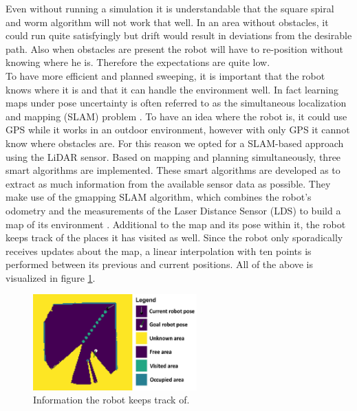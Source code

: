 \documentclass[conference]{IEEEtran}
\begin{document}
Even without running a simulation it is understandable that the square spiral and worm algorithm will not work that well. In an area without obstacles, it could run quite satisfyingly but drift would result in deviations from the desirable path. Also when obstacles are present the robot will have to re-position without knowing where he is. Therefore the expectations are quite low.\\

To have more efficient and planned sweeping, it is important that the robot knows where it is and that it can handle the environment well. In fact learning maps under pose uncertainty is often referred to as the simultaneous localization and mapping (SLAM) problem \cite{Grisetti2010}. To have an idea where the robot is, it could use GPS while it works in an outdoor environment, however with only GPS it cannot know where obstacles are. For this reason we opted for a SLAM-based approach using the LiDAR sensor. Based on mapping and planning simultaneously, three smart algorithms are implemented. These smart algorithms are developed as to extract as much information from the available sensor data as possible. They make use of the gmapping SLAM algorithm, which combines the robot's odometry and the measurements of the Laser Distance Sensor (LDS) to build a map of its environment \cite{gmapping}. Additional to the map and its pose within it, the robot keeps track of the places it has visited as well. Since the robot only sporadically receives updates about the map, a linear interpolation with ten points is performed between its previous and current positions. All of the above is visualized in figure \ref{fig:slambotinfo}.\\

\begin{figure}[htbp]
\centerline{\includegraphics[width=63mm]{SLAM_Info.jpg}}
\caption{Information the robot keeps track of.}
\label{fig:slambotinfo}
\end{figure}
\end{document}
